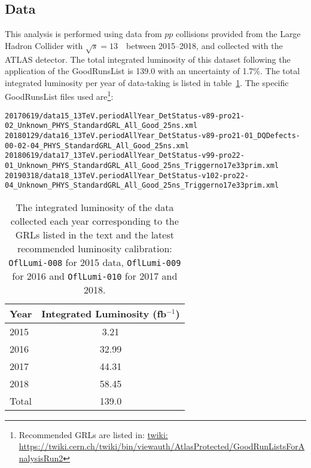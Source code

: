 \subsection{Data}
\label{subsec:data}

This analysis is performed using data from $pp$ collisions provided from the Large Hadron Collider with $\sqrt{s} = 13$~\TeV~between 2015--2018, and collected with the ATLAS detector. The total integrated luminosity of this dataset following the application of the GoodRunsList is \SI{139.0}{\ifb} with an uncertainty of 1.7\%.
The total integrated luminosity per year of data-taking is listed in table~\ref{tab:LumiYear}. The specific GoodRunsList files used are\footnote{Recommended GRLs are listed in: \url{twiki: https://twiki.cern.ch/twiki/bin/viewauth/AtlasProtected/GoodRunListsForAnalysisRun2}}:

\begin{scriptsize}
\begin{verbatim}
20170619/data15_13TeV.periodAllYear_DetStatus-v89-pro21-02_Unknown_PHYS_StandardGRL_All_Good_25ns.xml
20180129/data16_13TeV.periodAllYear_DetStatus-v89-pro21-01_DQDefects-00-02-04_PHYS_StandardGRL_All_Good_25ns.xml
20180619/data17_13TeV.periodAllYear_DetStatus-v99-pro22-01_Unknown_PHYS_StandardGRL_All_Good_25ns_Triggerno17e33prim.xml
20190318/data18_13TeV.periodAllYear_DetStatus-v102-pro22-04_Unknown_PHYS_StandardGRL_All_Good_25ns_Triggerno17e33prim.xml
\end{verbatim}
\end{scriptsize}

\begin{table}[h!]
    \centering
    \begin{tabular}{l|c}
    \hline
    \textbf{Year} & \textbf{Integrated Luminosity (fb$^{-1}$)} \\ \hline
    2015  &   3.21 \\\hline
    2016  &  32.99 \\\hline
    2017  &  44.31 \\ \hline
    2018  &  58.45 \\ \hline\hline
    Total & 139.0 \\ \hline
    \end{tabular}
    \caption{The integrated luminosity of the data collected each year corresponding to the GRLs listed in the text and the latest recommended luminosity calibration: \texttt{OflLumi-008} for 2015 data, \texttt{OflLumi-009} for 2016 and \texttt{OflLumi-010} for 2017 and 2018.}
    \label{tab:LumiYear}
\end{table}

